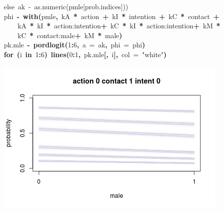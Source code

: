 \documentclass{article}
\makeatletter
\newcommand{\hlnumber}[1]{\textcolor[rgb]{0,0,0}{#1}}%
\newcommand{\hlfunctioncall}[1]{\textcolor[rgb]{.5,0,.33}{\textbf{#1}}}%
\newcommand{\hlstring}[1]{\textcolor[rgb]{.6,.6,1}{#1}}%
\newcommand{\hlkeyword}[1]{\textbf{#1}}%
\newcommand{\hlargument}[1]{\textcolor[rgb]{.69,.25,.02}{#1}}%
\newcommand{\hlcomment}[1]{\textcolor[rgb]{.18,.6,.34}{#1}}%
\newcommand{\hlassignement}[1]{\textbf{#1}}%
\newcommand{\hlsymbol}[1]{#1}%
\newcommand{\hlstd}[1]{\textcolor[rgb]{0,0,0}{#1}}%
\newenvironment{kframe}{%
 \def\FrameCommand##1{\hskip\@totalleftmargin \hskip-\fboxsep
 \colorbox{shadecolor}{##1}\hskip-\fboxsep
     \hskip-\linewidth \hskip-\@totalleftmargin \hskip\columnwidth}%
 \MakeFramed {\advance\hsize-\width
   \@totalleftmargin\z@ \linewidth\hsize
   \@setminipage}}%
 {\par\unskip\endMakeFramed}
\newenvironment{knitrout}{}{} %
\makeatother
\begin{document}
\begin{knitrout}
{\begin{kframe}
\begin{flushleft}
\hlstd{}\hlcomment{\usebox{\hlnormalsizeboxhash}else{\ }ak{\ }\usebox{\hlnormalsizeboxlessthan}-{\ }as.numeric(pmle[prob.indices]))}\hspace*{\fill}\\
\hlstd{}\hlsymbol{phi}{\ }\hlassignement{\usebox{\hlnormalsizeboxlessthan}-}{\ }\hlfunctioncall{with}\hlkeyword{(}\hlsymbol{pmle}\hlkeyword{,}{\ }\hlsymbol{kA}{\ }\hlkeyword{*}{\ }\hlsymbol{action}{\ }\hlkeyword{+}{\ }\hlsymbol{kI}{\ }\hlkeyword{*}{\ }\hlsymbol{intention}{\ }\hlkeyword{+}{\ }\hlsymbol{kC}{\ }\hlkeyword{*}{\ }\hlsymbol{contact}{\ }\hlkeyword{+}\hspace*{\fill}\\
\hlstd{}{\ }{\ }{\ }{\ }\hlsymbol{kA}{\ }\hlkeyword{*}{\ }\hlsymbol{kI}{\ }\hlkeyword{*}{\ }\hlsymbol{\usebox{\hlnormalsizeboxbacktick}action:intention\usebox{\hlnormalsizeboxbacktick}}{\ }\hlkeyword{+}{\ }\hlsymbol{kC}{\ }\hlkeyword{*}{\ }\hlsymbol{kI}{\ }\hlkeyword{*}{\ }\hlsymbol{\usebox{\hlnormalsizeboxbacktick}action:intention\usebox{\hlnormalsizeboxbacktick}}{\ }\hlkeyword{+}{\ }\hlsymbol{kM}{\ }\hlkeyword{*}\hspace*{\fill}\\
\hlstd{}{\ }{\ }{\ }{\ }\hlsymbol{kC}{\ }\hlkeyword{*}{\ }\hlsymbol{\usebox{\hlnormalsizeboxbacktick}contact:male\usebox{\hlnormalsizeboxbacktick}}{\ }\hlkeyword{+}{\ }\hlsymbol{kM}{\ }\hlkeyword{*}{\ }\hlsymbol{male}\hlkeyword{)}\hspace*{\fill}\\
\hlstd{}\hlsymbol{pk.mle}{\ }\hlassignement{\usebox{\hlnormalsizeboxlessthan}-}{\ }\hlfunctioncall{pordlogit}\hlkeyword{(}\hlnumber{1}\hlkeyword{:}\hlnumber{6}\hlkeyword{,}{\ }\hlargument{a}{\ }\hlargument{=}{\ }\hlsymbol{ak}\hlkeyword{,}{\ }\hlargument{phi}{\ }\hlargument{=}{\ }\hlsymbol{phi}\hlkeyword{)}\hspace*{\fill}\\
\hlstd{}\hlkeyword{for}{\ }\hlkeyword{(}\hlsymbol{i}{\ }\hlkeyword{in}{\ }\hlnumber{1}\hlkeyword{:}\hlnumber{6}\hlkeyword{)}{\ }\hlfunctioncall{lines}\hlkeyword{(}\hlnumber{0}\hlkeyword{:}\hlnumber{1}\hlkeyword{,}{\ }\hlsymbol{pk.mle}\hlkeyword{[}\hlkeyword{,}{\ }\hlsymbol{i}\hlkeyword{]}\hlkeyword{,}{\ }\hlargument{col}{\ }\hlargument{=}{\ }\hlstring{"{}white"{}}\hlkeyword{)}\mbox{}
\normalfont
\end{flushleft}


\centering{}\includegraphics{trolley-plots} 


\end{kframe}}
\end{knitrout}
\end{document}
